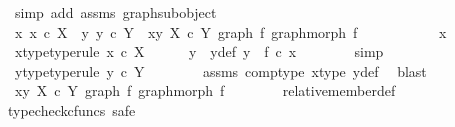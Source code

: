 \begin{isabellebody}
\ {\isacharparenleft}{\kern0pt}simp\ add{\isacharcolon}{\kern0pt}\ assms\ graph{\isacharunderscore}{\kern0pt}subobject{\isacharparenright}{\kern0pt}\isanewline
\ \ \isamarkupfalse%
\ {\isachardoublequoteopen}{\isasymAnd}x{\isachardot}{\kern0pt}\ x\ {\isasymin}\isactrlsub c\ X\ {\isasymLongrightarrow}\ {\isasymexists}y{\isachardot}{\kern0pt}\ y\ {\isasymin}\isactrlsub c\ Y\ {\isasymand}\ {\isasymlangle}x{\isacharcomma}{\kern0pt}y{\isasymrangle}\ {\isasymin}\isactrlbsub X\ {\isasymtimes}\isactrlsub c\ Y\isactrlesub \ {\isacharparenleft}{\kern0pt}graph\ f{\isacharcomma}{\kern0pt}\ graph{\isacharunderscore}{\kern0pt}morph\ f{\isacharparenright}{\kern0pt}{\isachardoublequoteclose}\isanewline
\ \ \isamarkupfalse%
\ {\isacharminus}{\kern0pt}\ \isanewline
\ \ \ \ \isamarkupfalse%
\ x\ \isanewline
\ \ \ \ \isamarkupfalse%
\ x{\isacharunderscore}{\kern0pt}type{\isacharbrackleft}{\kern0pt}type{\isacharunderscore}{\kern0pt}rule{\isacharbrackright}{\kern0pt}{\isacharcolon}{\kern0pt}\ {\isachardoublequoteopen}x\ {\isasymin}\isactrlsub c\ X{\isachardoublequoteclose}\isanewline
\ \ \ \ \isamarkupfalse%
\ y\ \ y{\isacharunderscore}{\kern0pt}def{\isacharcolon}{\kern0pt}\ {\isachardoublequoteopen}y\ {\isacharequal}{\kern0pt}\ f\ {\isasymcirc}\isactrlsub c\ x{\isachardoublequoteclose}\isanewline
\ \ \ \ \ \ \isamarkupfalse%
\ simp\isanewline
\ \ \ \ \isamarkupfalse%
\ \isamarkupfalse%
\ y{\isacharunderscore}{\kern0pt}type{\isacharbrackleft}{\kern0pt}type{\isacharunderscore}{\kern0pt}rule{\isacharbrackright}{\kern0pt}{\isacharcolon}{\kern0pt}\ {\isachardoublequoteopen}y\ {\isasymin}\isactrlsub c\ Y{\isachardoublequoteclose}\isanewline
\ \ \ \ \ \ \isamarkupfalse%
\ assms\ comp{\isacharunderscore}{\kern0pt}type\ x{\isacharunderscore}{\kern0pt}type\ y{\isacharunderscore}{\kern0pt}def\ \isamarkupfalse%
\ blast\isanewline
\isanewline
\ \ \ \ \isamarkupfalse%
\ {\isachardoublequoteopen}{\isasymlangle}x{\isacharcomma}{\kern0pt}y{\isasymrangle}\ {\isasymin}\isactrlbsub X\ {\isasymtimes}\isactrlsub c\ Y\isactrlesub \ {\isacharparenleft}{\kern0pt}graph\ f{\isacharcomma}{\kern0pt}\ graph{\isacharunderscore}{\kern0pt}morph\ f{\isacharparenright}{\kern0pt}{\isachardoublequoteclose}\isanewline
\ \ \ \ \ \ \isamarkupfalse%
\ relative{\isacharunderscore}{\kern0pt}member{\isacharunderscore}{\kern0pt}def\isanewline
\ \ \ \ \isamarkupfalse%
{\isacharparenleft}{\kern0pt}typecheck{\isacharunderscore}{\kern0pt}cfuncs{\isacharcomma}{\kern0pt}\ safe{\isacharparenright}{\kern0pt}\isanewline

\end{isabellebody}
